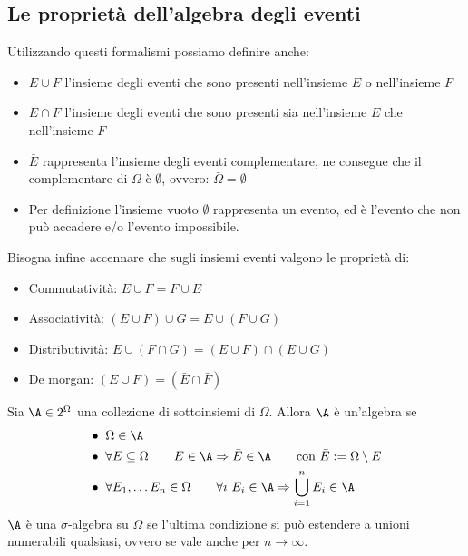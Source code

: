\subsection*{Le proprietà dell'algebra degli eventi}
Utilizzando questi formalismi possiamo definire anche:
\begin{itemize}
\item $E \cup F$ l'insieme degli eventi che sono presenti nell'insieme $E$ o nell'insieme $F$
\item $E \cap F$ l'insieme degli eventi che sono presenti sia nell'insieme $E$ che nell'insieme $F$
\item $\bar E$ rappresenta l'insieme degli eventi complementare, ne consegue che il complementare di $\Omega$ è $\emptyset$, ovvero: $\bar \Omega = \emptyset$
\item Per definizione l'insieme vuoto $\emptyset$ rappresenta un evento, ed è l'evento che non può accadere e/o l'evento impossibile.
\end{itemize}
Bisogna infine accennare che sugli insiemi eventi valgono le proprietà di:
\begin{itemize}
\item Commutatività: $E \cup F = F \cup E$
\item Associatività: $(E \cup F) \cup G = E \cup (F \cup G)$
\item Distributività: $E \cup (F \cap G) = (E \cup F) \cap (E \cup G)$
\item De morgan: $(E \cup F) = (\bar E \cap \bar F)$
\end{itemize}

\begin{defin}
	Sia $\A\in2^\Omega$ una collezione di sottoinsiemi di $\Omega$. Allora $\A$ è un'algebra se
	\begin{align*}
		 & \bullet ~ \Omega\in \A                                                                                            		\\
		 & \bullet ~ \forall E\subseteq\Omega\qquad E\in\A\Rightarrow \bar E\in\A \qquad\text{con }\bar E:=\Omega\setminus E \\
		 & \bullet ~ \forall E_1,\dots E_n\in\Omega\qquad \forall i~E_i\in\A\Rightarrow \bigcup\limits_{i=1}^n E_i \in\A
	\end{align*}
	$\A$ è una $\sigma$-algebra su $\Omega$ se l'ultima condizione si può estendere a unioni numerabili qualsiasi, ovvero se vale anche per $n \rightarrow \infty$.
\end{defin} %

